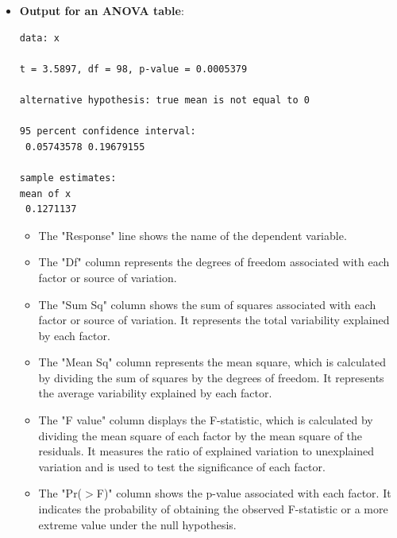\documentclass[12pt]{book}
\begin{document}
\begin{itemize}
\item \textbf{Output for an ANOVA table}:

\begin{mdframed}[backgroundcolor=gray!15, linecolor=black]
\begin{verbatim}
data: x

t = 3.5897, df = 98, p-value = 0.0005379

alternative hypothesis: true mean is not equal to 0

95 percent confidence interval:
 0.05743578 0.19679155

sample estimates:
mean of x
 0.1271137
\end{verbatim}
\end{mdframed}

\begin{itemize}
\item The "Response" line shows the name of the dependent variable.
\item The "Df" column represents the degrees of freedom associated with each factor or source of variation.
\item The "Sum Sq" column shows the sum of squares associated with each factor or source of variation. It represents the total variability explained by each factor.
\item The "Mean Sq" column represents the mean square, which is calculated by dividing the sum of squares by the degrees of freedom. It represents the average variability explained by each factor.
\item The "F value" column displays the F-statistic, which is calculated by dividing the mean square of each factor by the mean square of the residuals. It measures the ratio of explained variation to unexplained variation and is used to test the significance of each factor.
\item The "Pr($>$F)" column shows the p-value associated with each factor. It indicates the probability of obtaining the observed F-statistic or a more extreme value under the null hypothesis.
\end{itemize}
\end{itemize}


\newpage

\pagestyle{fancy}
\end{document}
